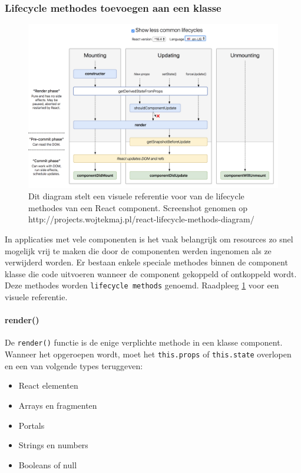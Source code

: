 \subsubsection{Lifecycle methodes toevoegen aan een klasse}

\begin{figure}
    \includegraphics[width=\linewidth]{./img/React_lifecycle_methods.png}
    \caption{Dit diagram stelt een visuele referentie voor van de lifecycle methodes van een React component. Screenshot genomen op http://projects.wojtekmaj.pl/react-lifecycle-methods-diagram/}
    \label{fig:react-lifecycle-diagram}
\end{figure}

In applicaties met vele componenten is het vaak belangrijk om resources zo snel mogelijk vrij te maken die door de componenten werden ingenomen als ze verwijderd worden. Er bestaan enkele speciale methodes binnen de component klasse die code uitvoeren wanneer de component gekoppeld of ontkoppeld wordt. Deze methodes worden \texttt{lifecycle methods} genoemd. Raadpleeg \ref{fig:react-lifecycle-diagram} voor een visuele referentie. \autocite{React2019c}

\paragraph{render()}

De \texttt{render()} functie is de enige verplichte methode in een klasse component. Wanneer het opgeroepen wordt, moet het \texttt{this.props} of \texttt{this.state} overlopen en een van volgende types teruggeven: \autocite{React2019d}
\begin{itemize}
    \item React elementen
    \item Arrays en fragmenten
    \item Portals
    \item Strings en numbers
    \item Booleans of null
\end{itemize}

